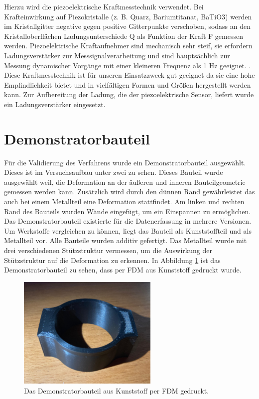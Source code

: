 Hierzu wird die piezoelektrische Kraftmesstechnik verwendet.
Bei Krafteinwirkung auf Piezokristalle (z. B. Quarz, Bariumtitanat, BaTiO3) 
werden im Kristallgitter negative gegen positive Gitterpunkte
verschoben, sodass an den Kristalloberflächen
Ladungsunterschiede Q als Funktion der Kraft F
gemessen werden.
Piezoelektrische Kraftaufnehmer sind mechanisch sehr steif, 
sie erfordern Ladungsverstärker
zur Messsignalverarbeitung und sind hauptsächlich zur Messung dynamischer Vorgänge
mit einer kleineren Frequenz als 1 Hz geeignet. \cite{Czichos.2020}. 
Diese Kraftmesstechnik ist 
für unseren Einsatzzweck gut geeignet da sie eine hohe Empfindlichkeit bietet 
und in vielfältigen Formen und Größen hergestellt werden kann. Zur Aufbereitung 
der Ladung, die der piezoelektrische Sensor, liefert wurde ein Ladungsverstärker 
eingesetzt.\cite{Schwartz.2006}

\section{Demonstratorbauteil} \label{demo_Bauteil}

Für die Validierung des Verfahrens wurde ein Demonstratorbauteil ausgewählt.
Dieses ist im Versuchsaufbau unter zwei zu sehen. Dieses Bauteil wurde ausgewählt 
weil, die Deformation an der äußeren und inneren Bauteilgeometrie gemessen werden kann.
Zusätzlich wird durch den dünnen Rand gewährleistet das auch bei einem Metallteil 
eine Deformation stattfindet. Am linken und rechten Rand des Bauteils wurden Wände 
eingefügt, um ein Einspannen zu ermöglichen.
Das Demonstratorbauteil existierte für die Datenerfassung in mehrere Versionen.
Um Werkstoffe vergleichen zu können, liegt das Bauteil als Kunststoffteil und als Metallteil vor.
Alle Bauteile wurden additiv gefertigt.
Das Metallteil wurde mit drei verschiedenen Stützstruktur vermessen, um die Auswirkung 
der Stützstruktur auf die Deformation zu erkennen. In Abbildung \ref{fig:demofdm} ist 
das Demonstratorbauteil zu sehen, dass per FDM aus Kunststoff gedruckt wurde.

\begin{figure}[H]
    \centering
    \includegraphics[width=0.6\textwidth]{images/demo_fdm.jpg}
    \caption{Das Demonstratorbauteil aus Kunststoff per FDM gedruckt.}
    \label{fig:demofdm}
\end{figure}
